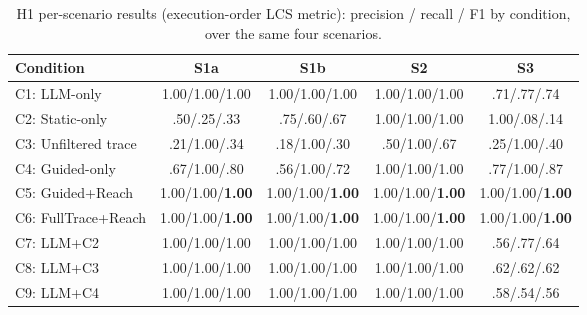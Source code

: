 \begin{table}[htb]
\centering
\caption{H1 per-scenario results (execution-order LCS metric): precision /
  recall / F1 by condition, over the same four scenarios.}
\label{tab:h1-per-scenario-seq}
\small
\begin{tabular}{@{} l c c c c @{}}
\toprule
\textbf{Condition} & \textbf{S1a} & \textbf{S1b} & \textbf{S2} & \textbf{S3} \\
\midrule
C1: LLM-only            & 1.00/1.00/1.00 & 1.00/1.00/1.00 & 1.00/1.00/1.00 & .71/.77/.74 \\
C2: Static-only         & .50/.25/.33    & .75/.60/.67    & 1.00/1.00/1.00 & 1.00/.08/.14 \\
C3: Unfiltered trace    & .21/1.00/.34   & .18/1.00/.30   & .50/1.00/.67   & .25/1.00/.40 \\
C4: Guided-only         & .67/1.00/.80   & .56/1.00/.72   & 1.00/1.00/1.00 & .77/1.00/.87 \\
C5: Guided+Reach        & 1.00/1.00/\textbf{1.00} & 1.00/1.00/\textbf{1.00} & 1.00/1.00/\textbf{1.00} & 1.00/1.00/\textbf{1.00} \\
C6: FullTrace+Reach     & 1.00/1.00/\textbf{1.00} & 1.00/1.00/\textbf{1.00} & 1.00/1.00/\textbf{1.00} & 1.00/1.00/\textbf{1.00} \\
C7: LLM+C2              & 1.00/1.00/1.00 & 1.00/1.00/1.00 & 1.00/1.00/1.00 & .56/.77/.64 \\
C8: LLM+C3              & 1.00/1.00/1.00 & 1.00/1.00/1.00 & 1.00/1.00/1.00 & .62/.62/.62 \\
C9: LLM+C4              & 1.00/1.00/1.00 & 1.00/1.00/1.00 & 1.00/1.00/1.00 & .58/.54/.56 \\
\bottomrule
\end{tabular}
\end{table}

